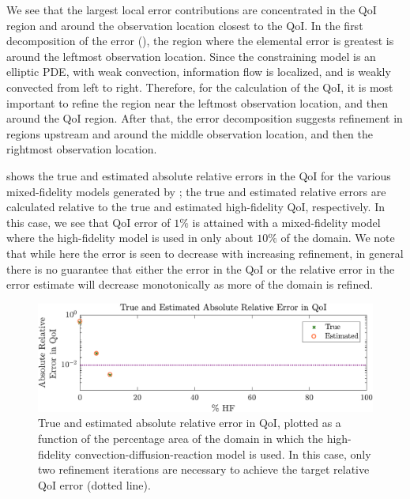 \documentclass[review,sort&compress]{elsarticle}
\theoremstyle{plain} %
\theoremstyle{definition} %
\begin{document}
We see that the largest local error contributions are concentrated in the QoI region and around the observation location closest to the QoI. In the first decomposition of the error (), the region where the elemental error is greatest is around the leftmost observation location. Since the constraining model is an elliptic PDE, with weak convection, information flow is localized, and is weakly convected from left to right. Therefore, for the calculation of the QoI, it is most important to refine the region near the leftmost observation location, and then around the QoI region. After that, the error decomposition suggests refinement in regions upstream and around the middle observation location, and then the rightmost observation location.

 shows the true and estimated absolute relative errors in the QoI for the various mixed-fidelity models generated by ; the true and estimated relative errors are calculated relative to the true and estimated high-fidelity QoI, respectively. In this case, we see that QoI error of $1\%$ is attained with a mixed-fidelity model where the high-fidelity model is used in only about $10\%$ of the domain. We note that while here the error is seen to decrease with increasing refinement, in general there is no guarantee that either the error in the QoI or the relative error in the error estimate will decrease monotonically as more of the domain is refined.
%
\begin{figure}[htbp]
\centering
\includegraphics[width=\textwidth]{baseSeries/err_est_v2.pdf}
\caption{True and estimated absolute relative error in QoI, plotted as a function of the percentage area of the domain in which the high-fidelity convection-diffusion-reaction model is used. In this case, only two refinement iterations are necessary to achieve the target relative QoI error (dotted line).}
\label{fig:baseErr}
\end{figure}
%
\end{document}
